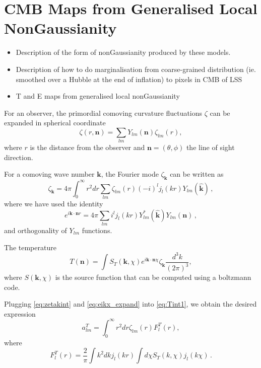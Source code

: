 \section{CMB Maps from Generalised Local NonGaussianity}
\begin{itemize}
\item Description of the form of nonGaussianity produced by these models.
\item Description of how to do marginalisation from coarse-grained distribution (ie. smoothed over a Hubble at the end of inflation) to pixels in CMB of LSS
\item T and E maps from generalised local nonGaussianity
\end{itemize}

For an observer,  the primordial comoving curvature fluctuations  $\zeta$ can be expanded in spherical coordinate 
\begin{equation}
  \zeta(r, \mathbf{n}) = \sum_{lm} Y_{lm}(\mathbf{n})\zeta_{lm}(r),
\end{equation}
where $r$ is the distance from the observer and $\mathbf{n} = (\theta, \phi)$ the line of sight direction.

 For a comoving wave number $\mathbf{k}$, the Fourier mode $\zeta_{\mathbf{k}}$ can be written as
\begin{equation}
  \zeta_{\mathbf{k}} = 4\pi \int_0^\infty r^2dr\sum_{lm}\zeta_{lm}(r) (-i)^l j_l(kr) Y_{lm}(\hat{\mathbf{k}})\, , \label{eq:zetakint}
\end{equation}
where we have used the identity
\begin{equation}
  e^{i\mathbf{k}\cdot\mathbf{n}r} = 4\pi \sum_{lm}i^l j_l(kr) Y^*_{lm}(\hat{\mathbf{k}}) Y_{lm}(\mathbf{n}) \, , \label{eq:eikx_expand}
\end{equation}
and orthogonality of $Y_{lm}$ functions.


The temperature 
\begin{equation}
T({\mathbf{n}}) = \int S_T(\mathbf{k}, \chi) e^{i \mathbf{k}\cdot\mathbf{n} \chi}\zeta_{\mathbf{k}}\frac{d^3k}{(2\pi)^3}, \label{eq:Tint1}
\end{equation}
where $S(\mathbf{k}, \chi)$ is the source function that can be computed using a boltzmann code.

Plugging \eqref{eq:zetakint} and \eqref{eq:eikx_expand} into \eqref{eq:Tint1}, we obtain the desired expression
\begin{equation}
a_{lm}^T = \int_0^\infty r^2dr \zeta_{lm}(r) F^T_l(r),
\end{equation}
where
\begin{equation}
F^T_l(r) = \frac{2}{\pi} \int k^2dk j_l(kr) \int d\chi S_T(k, \chi) j_l(k\chi) \, .
\end{equation}

